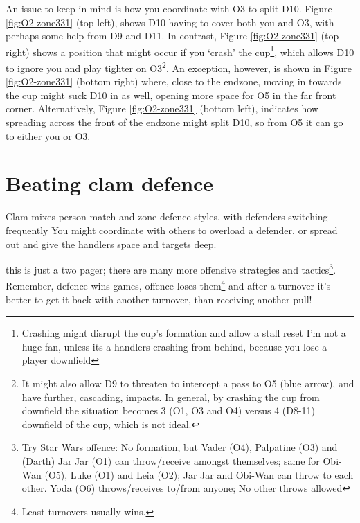 \documentclass{tufte-handout}
\begin{document}
An issue 
to keep in mind 
is how you 
coordinate 
with O3 
to split 
D10. 
Figure \ref{fig:O2-zone331}
(top left), 
shows D10 
having to 
cover both 
you and O3, 
with perhaps some help 
from D9 
and D11. 
In contrast, 
Figure \ref{fig:O2-zone331}
(top right) 
shows a position 
that might occur 
if you `crash' 
the cup\footnote{ 
Crashing 
might  
disrupt the 
cup's formation and 
allow a stall reset 
I'm not a huge fan, 
unless its a handlers 
crashing from behind, 
because you lose 
a player downfield},
which allows
D10 
to ignore you 
and play 
tighter on O3\footnote{ 
It might also allow 
D9 to threaten to intercept 
a pass to O5 
(blue arrow), 
and have further,
cascading, 
impacts. 
In general, 
by crashing the cup
from downfield 
the situation 
becomes 3 (O1, O3 and O4) 
versus 4 (D8-11) 
downfield of the cup, 
which is not ideal.}. 
An exception, 
however,
is shown in 
Figure \ref{fig:O2-zone331}
(bottom right)
where, close to the endzone, 
moving in towards 
the cup 
might suck D10 
in as well, 
opening more space for O5 
in the far front corner.  
Alternatively, 
Figure \ref{fig:O2-zone331}
(bottom left), 
indicates how spreading 
across the front of the endzone
might split D10, 
so 
from O5 
it can go to  
either you 
or O3. 


\section{Beating clam defence}\label{sec:zone}
Clam mixes person-match 
and zone defence styles, 
with defenders 
switching frequently
You might
coordinate 
with others  
to overload 
a defender, 
or spread out 
and give the handlers 
space 
and targets deep. 

this is just a two pager; 
there are many more 
offensive strategies 
and tactics\footnote{
Try Star Wars offence: 
No formation, but
Vader (O4), 
Palpatine (O3) and 
(Darth) Jar Jar (O1) can throw/receive amongst themselves;
same for Obi-Wan (O5), 
Luke (O1) 
and Leia (O2); 
Jar Jar 
and Obi-Wan 
can throw to each other. 
Yoda (O6) throws/receives to/from anyone;
No other throws allowed}.  
Remember, 
defence wins games, 
offence loses them\footnote{
Least turnovers 
usually wins.} 
and after a turnover 
it's better to get it back 
with another turnover, 
than receiving another pull!
\end{document}
